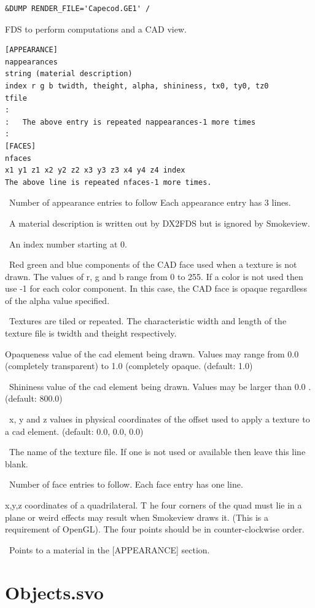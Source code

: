 \documentclass[11pt,twoside]{book}
\newcommand{\parma}{.75}
\newcommand{\parmb}{.5}
\newcommand{\parmc}{0.25}
\newcommand{\blist}{
\begin{list}
{}{
\setlength{\leftmargin}{\parma in}
\setlength{\labelwidth}{\parmb in}
\setlength{\labelsep}{\parmc in}
\setlength{\listparindent}{0.3in}
\setlength{\topsep}{.3in}
\setlength{\parsep}{.0in}
}}
\newcommand{\elist}{\end{list}}
\newcommand{\hitem}[1]{\item[{\bf #1} \hfill]}
\begin{document}
\begin{lstlisting}
&DUMP RENDER_FILE='Capecod.GE1' /
\end{lstlisting}

FDS to perform computations and a CAD view.

\begin{lstlisting}
[APPEARANCE]
nappearances
string (material description)
index r g b twidth, theight, alpha, shininess, tx0, ty0, tz0
tfile
:
:   The above entry is repeated nappearances-1 more times
:
[FACES]
nfaces
x1 y1 z1 x2 y2 z2 x3 y3 z3 x4 y4 z4 index
The above line is repeated nfaces-1 more times.
\end{lstlisting}

\blist

\hitem{nappearances}\ Number of appearance entries to follow
Each appearance entry has 3 lines.
\hitem{string}\ A material description is written out by DX2FDS but is ignored by Smokeview.
\hitem{index}\ An index number starting at 0.
\hitem{r, g, b}\ Red green and blue components of the CAD face used when a texture is not drawn.
The values of r, g and b range from 0 to 255.  If a color is not used
then use -1 for each color component.  In this case, the CAD face is opaque regardless of the alpha value specified.
\hitem{twidth, theight}\ Textures are tiled or repeated.
The characteristic width and length of the
texture file is twidth and theight respectively.
\hitem{alpha}Opaqueness value of the cad element being drawn.
Values may range from 0.0 (completely transparent)
to 1.0 (completely opaque.  (default: 1.0)
\hitem{shininess}\ Shininess value of the cad element being drawn.
Values may be larger than 0.0 .  (default: 800.0)
\hitem{tx0, ty0, tz0}\ x, y and z values in physical coordinates of the offset used to apply a
texture to a cad element. (default: 0.0, 0.0, 0.0)
\hitem{tfile}\ The name of the texture file.  If one is not used or
available then leave this line blank.
\hitem{nfaces}\ Number of face entries to follow.  Each face entry has one line.
\hitem{x1/y1/z1/.../x4/y4/z4}x,y,z coordinates of a quadrilateral.  T
he four corners of the quad
must lie in a plane or weird effects may result when Smokeview draws it.
(This is a requirement
of OpenGL).  The four points should be in counter-clockwise order.
\hitem{index}\ Points to a material in the [APPEARANCE] section.
\elist

\section{Objects.svo}
\label{section:objects}

\end{document}
